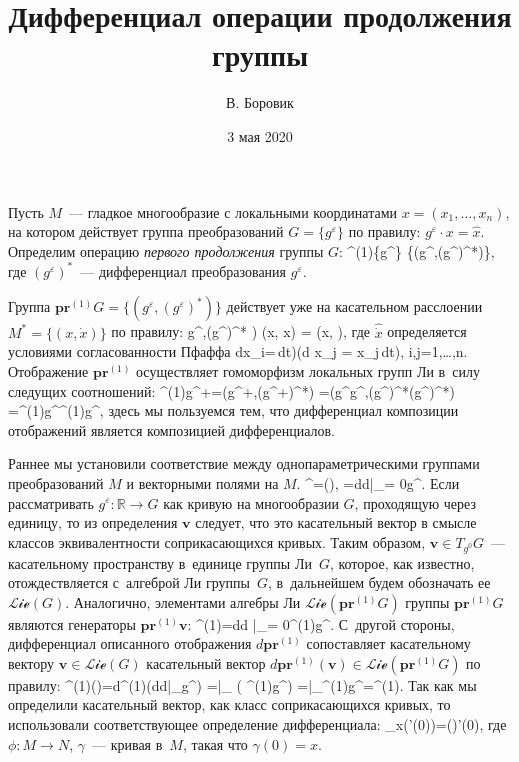 \documentclass[a4paper,11pt]{article}
\title{Дифференциал операции продолжения группы}
\author{В. Боровик}
\date{3 мая 2020}
\def\[#1\]{\begin{align*}#1\end{align*}}
\newcommand{\pr}{\mathbf{pr}}
\newcommand{\vv}{\mathbf{v}}
\begin{document}
\maketitle
\sloppy

Пусть $M$~—  гладкое многообразие с локальными координатами $x =
(x_1,\ldots,x_n)$, на котором действует группа  преобразований $G=\{g^\varepsilon\}$ по правилу: $g^\varepsilon\cdot x=\hat x$.
Определим операцию \textit{первого продолжения\/} группы $G$:
	\[
	\pr^{(1)}\colon\{g^{\varepsilon}\} \rightarrow \{\left(g^{\varepsilon},(g^{\varepsilon})^*\right)\},
	\]
где $(g^{\varepsilon})^*$~— дифференциал преобразования $g^\varepsilon$.

Группа $\pr^{(1)}G = \{\left(g^{\varepsilon},(g^{\varepsilon})^* \right)\}$ действует уже на касательном расслоении $M^* = \{(x, \dot x)\}$ по правилу:
	\[
	(g^{\varepsilon},(g^{\varepsilon})^* ) \cdot (x, \dot x) = (\hat x, ),
	\]
где $\hat{\dot x}$ определяется условиями согласованности Пфаффа
	\[
	(d\hat x_i=\,dt)\bmod(d x_j = \dot x_j\,dt),
	\quad
	i,j=1,\ldots,n.
	\]
Отображение $\pr^{(1)}$ осуществляет гомоморфизм локальных групп Ли в~силу
следущих соотношений:
	\[
	\pr^{(1)}g^{\alpha+\beta}=\left(g^{\alpha+\beta},(g^{\alpha+\beta})^*\right)
		=(g^\beta\circ g^\alpha,(g^\beta)^*\circ(g^\alpha)^*)
		=\pr^{(1)}g^\alpha\circ\pr^{(1)}g^\beta,
	\]
здесь мы пользуемся тем, что дифференциал композиции отображений является
композицией дифференциалов.

Раннее мы установили соответствие между однопараметрическими группами
преобразований $M$ и векторными полями на $M$. 
	\[
	g^\varepsilon=(\varepsilon \vv),
	\quad
	\vv=\frac d{d\varepsilon}\bigg |_{\varepsilon = 0}g^{\varepsilon}.
	\]
Если рассматривать $g^\varepsilon\colon\mathbb{R}\to G$ как кривую на
многообразии $G$, проходящую через единицу, то из определения $\vv$ следует,
что это касательный вектор в смысле классов эквивалентности соприкасающихся
кривых. Таким образом, $\vv\in T_{g^0}G$~—  касательному пространству в~единице
группы Ли~$G$, которое, как известно, отождествляется с~алгеброй Ли группы~$G$,
в~дальнейшем будем обозначать ее $\mathcal{Lie}(G)$. Аналогично, элементами
алгебры Ли $\mathcal{Lie}(\pr^{(1)}G)$ группы $\pr^{(1)}G$ являются генераторы
$\pr^{(1)}\vv$:
	\[
	\pr^{(1)}\vv=\frac d{d \varepsilon}\bigg|_{\varepsilon = 0}\pr^{(1)}g^{\varepsilon}.
	\]
С~другой стороны, дифференциал описанного отображения $d\pr^{(1)}$ сопоставляет
касательному вектору $\vv\in\mathcal{Lie}(G)$ касательный вектор
$d\pr^{(1)}(\vv) \in \mathcal{Lie}(\pr^{(1)}G)$ по правилу:
	\[
	d\pr^{(1)}(\vv)=d\pr^{(1)}\left(\frac d{d\varepsilon}\bigg|_{}g^\varepsilon\right)
		=\bigg |_{} \left( \pr^{(1)}\circ g^\varepsilon\right)
		=\bigg |_{}\pr^{(1)}g^\varepsilon=\pr^{(1)}\vv.
	\]
Так как мы определили касательный вектор, как класс соприкасающихся кривых, то
использовали соответствующее определение дифференциала:
	\[
	d_x\phi(\gamma'(0))=(\phi \circ \gamma)'(0),
	\]
где $\phi\colon M\to N$, $\gamma$~— кривая в~$M$, такая что $\gamma(0)=x$.
\end{document}
